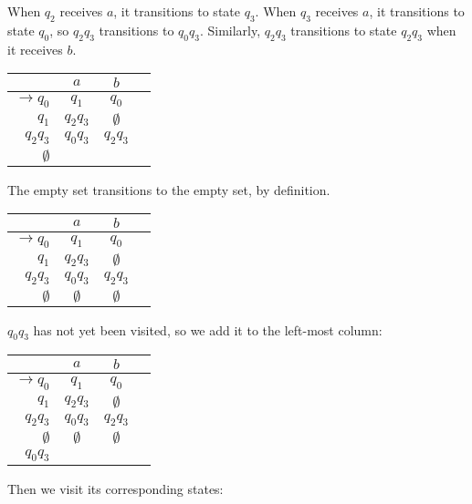 When \(q_2\) receives \(a\), it transitions to state \(q_3\). When \(q_3\) receives \(a\), it transitions to state \(q_0\), so \(q_2q_3\) transitions to \(q_0q_3\). Similarly, \(q_2q_3\) transitions to state \(q_2q_3\) when it receives \(b\).

\begin{center}\begin{tabular}{r c c r}
         & \(a\) & \(b\) & \\\bottomrule
    \(\to q_0\) & \(q_1\) & \(q_0\) &  \\
          \(q_1\) & \(q_2q_3\) & \(\emptyset \) & \\
          \(q_2q_3\) & \(q_0q_3\) & \(q_2q_3\) & \\
          \(\emptyset \) & & &
\end{tabular}\end{center}

The empty set transitions to the empty set, by definition. 

\begin{center}\begin{tabular}{r c c r}
         & \(a\) & \(b\) & \\\bottomrule
    \(\to q_0\) & \(q_1\) & \(q_0\) &  \\
          \(q_1\) & \(q_2q_3\) & \(\emptyset \) & \\
          \(q_2q_3\) & \(q_0q_3\) & \(q_2q_3\) & \\
          \(\emptyset \) & \(\emptyset \) & \(\emptyset \) &
\end{tabular}\end{center}

\(q_0q_3\) has not yet been visited, so we add it to the left-most column:

\begin{center}\begin{tabular}{r c c r}
         & \(a\) & \(b\) & \\\bottomrule
    \(\to q_0\) & \(q_1\) & \(q_0\) &  \\
          \(q_1\) & \(q_2q_3\) & \(\emptyset \) & \\
          \(q_2q_3\) & \(q_0q_3\) & \(q_2q_3\) & \\
          \(\emptyset \) & \(\emptyset \) & \(\emptyset \) &\\
          \(q_0q_3\) & & & 
\end{tabular}\end{center}

Then we visit its corresponding states:

